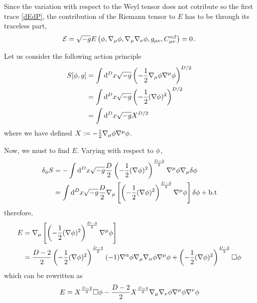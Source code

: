 Since the variation with respect to the Weyl tensor does not cotribute so the first trace \eqref{dEdP}, the contribution of the Riemann tensor to $E$ has to be through its traceless part,
\begin{equation}
	\mathcal{E} =\sqrt{-g}E\left(\phi,\nabla_\mu \phi ,\nabla_\mu \nabla_\nu \phi ,g_{\mu\nu },C_{\mu\nu }^{\alpha\beta }\right)=0\,.
\end{equation}

\begin{ej}
	Let us consider the following action principle
	\begin{align}
  S[\phi,g]&=\int\dd^Dx\sqrt{-g}\left(-\frac{1}{2}\nabla_\mu \phi\nabla^\mu \phi \right)^{D/2}\\
  &=\int\dd^Dx\sqrt{-g}\left(-\frac{1}{2}(\nabla\phi )^2\right)^{D/2}\\
  &=\int\dd^Dx\sqrt{-g}X^{D/2}
\end{align}
where we have defined $X:=-\frac{1}{2}\nabla_\mu \phi\nabla^\mu \phi$. 

Now, we must to find $E$. Varying with respect to $\phi$,
\begin{align}
  \delta_\phi S&=-\int\dd^Dx\sqrt{-g}\frac{D}{2}\left(-\frac{1}{2}(\nabla\phi )^2\right)^{\frac{D-2}{2}}\nabla^\mu\phi \nabla_\mu \delta\phi \\
  &=\int\dd^Dx\sqrt{-g}\frac{D}{2}\nabla_\mu \left[\left(-\frac{1}{2}(\nabla\phi )^2\right)^{\frac{D-2}{2}}\nabla^\mu \phi \right]\delta\phi +\rm b.t
\end{align}
therefore,
\begin{align}
  E&=\nabla_\mu \left[\left(-\frac{1}{2}(\nabla\phi )^2\right)^{\frac{D-2}{2}}\nabla^\mu \phi \right]\\
  &=\frac{D-2}{2}\left(-\frac{1}{2}(\nabla\phi )^2\right)^{\frac{D-4}{2}}(-1)\nabla^\alpha \phi \nabla_\mu \nabla_\alpha\phi \nabla^\mu \phi +\left(-\frac{1}{2}(\nabla\phi )^2\right)^{\frac{D-2}{2}}\Box\phi 
\end{align}
which can be rewritten as
\begin{equation}
  E=X^{\frac{D-2}{2}}\Box\phi -\frac{D-2}{2}X^{\frac{D-4}{2}}\nabla_\mu \nabla_\nu \phi\nabla^\mu \phi\nabla^\nu \phi 
\end{equation}


\end{ej}
